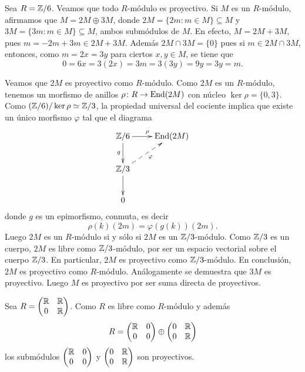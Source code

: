 \begin{example}
	Sea $R=\mathbb{Z}/6$. 
	Veamos que todo $R$-módulo es proyectivo. Si $M$ es un $R$-módulo, afirmamos que $M=2M\oplus 3M$, donde
	$2M=\{2m:m\in M\}\subseteq M$ y $3M=\{3m:m\in M\}\subseteq M$, ambos submódulos de $M$. En efecto, $M=2M+3M$, pues $m=-2m+3m\in 2M+3M$. Además 
	$2M\cap 3M=\{0\}$ pues si $m\in 2M\cap 3M$, entonces, como $m=2x=3y$ para ciertos $x,y\in M$, se tiene que
	\[
	0=6x=3(2x)=3m=3(3y)=9y=3y=m.
	\]
	
	Veamos que $2M$ es proyectivo como $R$-módulo. 
	Como $2M$ es un $R$-módulo, tenemos un morfismo de anillos
	$\rho\colon R\to\operatorname{End}(2M)$ con núcleo $\ker\rho=\{0,3\}$. 
	Como $(\mathbb{Z}/6)/\ker\rho\simeq\mathbb{Z}/3$, la propiedad universal del cociente 
	implica  
	que existe un único morfismo $\varphi$ 
	tal que el diagrama 
	\[
        \xymatrix{
        \Z/6
        \ar[d]_g
        \ar[r]^\rho
        & \End(2M)
        \\
        \Z/3
        \ar[d]
        \ar@{-->}[ur]_{\varphi}
        \\
        0
        }
	\]
	donde $g$ es un epimorfismo, 
	conmuta, es decir
	\[
	\rho(k)(2m)=\varphi(g(k))(2m).
	\] 
	Luego $2M$ es un $R$-módulo si y sólo si $2M$ es un $\mathbb{Z}/3$-módulo. 
	Como $\mathbb{Z}/3$ es un cuerpo, $2M$ es
	libre como $\mathbb{Z}/3$-módulo, 
	por ser un espacio vectorial sobre el cuerpo $\mathbb{Z}/3$. En particular, 
	$2M$ es proyectivo como $\mathbb{Z}/3$-módulo. En conclusión, $2M$ es proyectivo
	como $R$-módulo. Análogamente se demuestra que $3M$ es proyectivo. Luego
	$M$ es proyectivo por ser suma directa de proyectivos.  
\end{example}

\begin{example}
Sea $R=\begin{pmatrix}
\mathbb{R} & \mathbb{R}\\
0 & \mathbb{R}
\end{pmatrix}$. Como $R$ es libre como $R$-módulo y además 
\[
R=\begin{pmatrix}
\mathbb{R} & 0\\
0 & 0
\end{pmatrix}
\oplus\begin{pmatrix}
0 & \mathbb{R}\\
0 & \mathbb{R}
\end{pmatrix}
\]
los submódulos $\begin{pmatrix}
\mathbb{R} & 0\\
0 & 0
\end{pmatrix}$ y 
$\begin{pmatrix}
0 & \mathbb{R}\\
0 & \mathbb{R}
\end{pmatrix}$ son proyectivos. 
\end{example}

